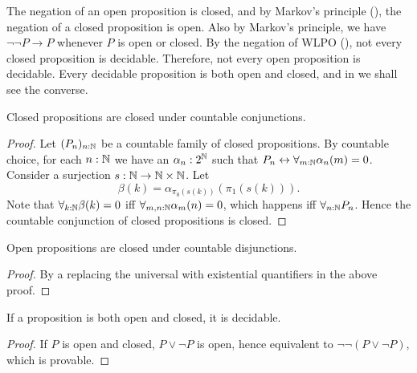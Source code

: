 \begin{remark}\label{rmkOpenClosedNegation}
  The negation of an open proposition is closed, 
  and by Markov's principle (), the negation of a closed proposition is open. 
  Also by Markov's principle, we have $\neg \neg P \to P$ whenever $P$ is open or closed. 
  By the negation of WLPO (), 
  not every closed proposition is decidable. 
  Therefore, not every open proposition is decidable. 
  Every decidable proposition is both open and closed, 
  and in  we shall see the converse. 
\end{remark}
\begin{lemma}\label{ClosedCountableConjunction}
  Closed propositions are closed under countable conjunctions.
\end{lemma}
\begin{proof}
  Let $(P_n)_{n:\mathbb{N}}$ be a countable family of closed propositions. 
  By countable choice, for each 
  $n:\mathbb{N}$ we have an $\alpha_n:2^{\mathbb{N}} $ 
  such that $P_n \leftrightarrow \forall_{m:\mathbb{N}} \alpha_n(m)  =0$. 
  Consider a surjection $s:\mathbb{N} \to \mathbb{N} \times \mathbb{N}$.
  Let 
  $$\beta(k) = \alpha_{\pi_0(s(k))}(\pi_1 (s(k))).$$
  Note that $\forall_{k:\mathbb{N}} \beta(k) = 0$ iff 
  $\forall_{m,n:\mathbb{N}}\alpha_m(n) = 0$, which happens iff $\forall_{n:\mathbb{N}} P_n$. 
  Hence the countable conjunction of closed propositions is closed. 
\end{proof} 
\begin{lemma}\label{OpenCountableDisjunction}
  Open propositions are closed under countable disjunctions. 
\end{lemma}
\begin{proof}
  By a replacing the universal with existential quantifiers in the above proof. 
\end{proof}
\begin{corollary}\label{ClopenDecidable}
  If a proposition is both open and closed, it is decidable. 
\end{corollary}
\begin{proof}
  If $P$ is open and closed, $P\vee \neg P$ is open, hence
  equivalent to $\neg \neg (P \vee \neg P)$, which is provable. 
\end{proof}

